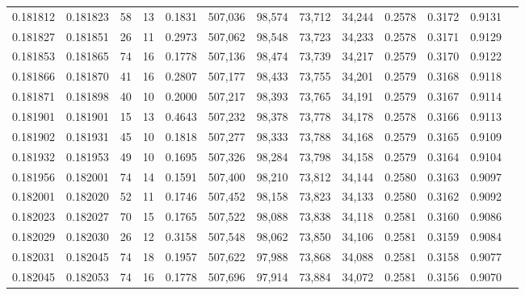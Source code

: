 \begin{tabular}{rrrrrrrrrrrrr}
0.181812 & 0.181823 &    58 &  13 &                                     0.1831 & 507,036 &  98,574 &  73,712 &  34,244 & 0.2578 & 0.3172 & 0.9131 \\
0.181827 & 0.181851 &    26 &  11 &                                     0.2973 & 507,062 &  98,548 &  73,723 &  34,233 & 0.2578 & 0.3171 & 0.9129 \\
0.181853 & 0.181865 &    74 &  16 &                                     0.1778 & 507,136 &  98,474 &  73,739 &  34,217 & 0.2579 & 0.3170 & 0.9122 \\
0.181866 & 0.181870 &    41 &  16 &                                     0.2807 & 507,177 &  98,433 &  73,755 &  34,201 & 0.2579 & 0.3168 & 0.9118 \\
0.181871 & 0.181898 &    40 &  10 &                                     0.2000 & 507,217 &  98,393 &  73,765 &  34,191 & 0.2579 & 0.3167 & 0.9114 \\
0.181901 & 0.181901 &    15 &  13 &                                     0.4643 & 507,232 &  98,378 &  73,778 &  34,178 & 0.2578 & 0.3166 & 0.9113 \\
0.181902 & 0.181931 &    45 &  10 &                                     0.1818 & 507,277 &  98,333 &  73,788 &  34,168 & 0.2579 & 0.3165 & 0.9109 \\
0.181932 & 0.181953 &    49 &  10 &                                     0.1695 & 507,326 &  98,284 &  73,798 &  34,158 & 0.2579 & 0.3164 & 0.9104 \\
0.181956 & 0.182001 &    74 &  14 &                                     0.1591 & 507,400 &  98,210 &  73,812 &  34,144 & 0.2580 & 0.3163 & 0.9097 \\
0.182001 & 0.182020 &    52 &  11 &                                     0.1746 & 507,452 &  98,158 &  73,823 &  34,133 & 0.2580 & 0.3162 & 0.9092 \\
0.182023 & 0.182027 &    70 &  15 &                                     0.1765 & 507,522 &  98,088 &  73,838 &  34,118 & 0.2581 & 0.3160 & 0.9086 \\
0.182029 & 0.182030 &    26 &  12 &                                     0.3158 & 507,548 &  98,062 &  73,850 &  34,106 & 0.2581 & 0.3159 & 0.9084 \\
0.182031 & 0.182045 &    74 &  18 &                                     0.1957 & 507,622 &  97,988 &  73,868 &  34,088 & 0.2581 & 0.3158 & 0.9077 \\
0.182045 & 0.182053 &    74 &  16 &                                     0.1778 & 507,696 &  97,914 &  73,884 &  34,072 & 0.2581 & 0.3156 & 0.9070 \\

\end{tabular}
